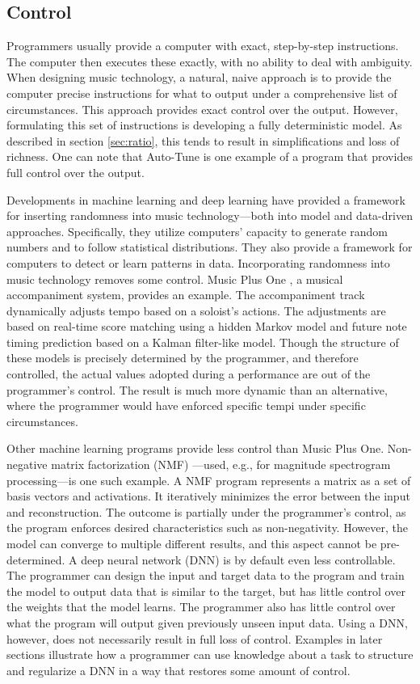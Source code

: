 \subsection{Control}
Programmers usually provide a computer with exact, step-by-step instructions. The computer then executes these exactly, with no ability to deal with ambiguity. When designing music technology, a natural, naive approach is to provide the computer precise instructions for what to output under a comprehensive list of circumstances. This approach provides exact control over the output. However, formulating this set of instructions is developing a fully deterministic model. As described in section \ref{sec:ratio}, this tends to result in simplifications and loss of richness. One can note that Auto-Tune is one example of a program that provides full control over the output.

Developments in machine learning and deep learning have provided a framework for inserting randomness into music technology---both into model and data-driven approaches. Specifically, they utilize computers' capacity to generate random numbers and to follow statistical distributions. They also provide a framework for computers to detect or learn patterns in data. Incorporating randomness into music technology removes some control. Music Plus One \cite{raphael2010music}, a musical accompaniment system, provides an example. The accompaniment track dynamically adjusts tempo based on a soloist's actions. The adjustments are based on real-time score matching using a hidden Markov model and future note timing prediction based on a Kalman filter-like model. Though the structure of these models is precisely determined by the programmer, and therefore controlled, the actual values adopted during a performance are out of the programmer's control. The result is much more dynamic than an alternative, where the programmer would have enforced specific tempi under specific circumstances. 

Other machine learning programs provide less control than Music Plus One. Non-negative matrix factorization (NMF) \cite{LeeDD2000nips}---used, e.g., for magnitude spectrogram processing---is one such example. A NMF program represents a matrix as a set of basis vectors and activations. It iteratively minimizes the error between the input and reconstruction. The outcome is partially under the programmer's control, as the program enforces desired characteristics such as non-negativity. However, the model can converge to multiple different results, and this aspect cannot be pre-determined. A deep neural network (DNN) is by default even less controllable. The programmer can design the input and target data to the program and train the model to output data that is similar to the target, but has little control over the weights that the model learns. The programmer also has little control over what the program will output given previously unseen input data. Using a DNN, however, does not necessarily result in full loss of control. Examples in later sections illustrate how a programmer can use knowledge about a task to structure and regularize a DNN in a way that restores some amount of control. 

